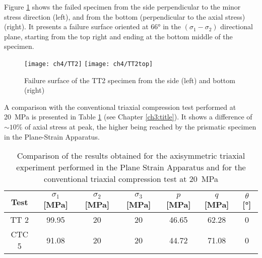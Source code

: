 Figure \ref{fig4:14} shows the failed specimen from the side perpendicular to the minor stress direction (left), and from the bottom (perpendicular to the axial stress)(right). It presents a failure surface oriented at \ang{66} in the $(\sigma_1-\sigma_{2})$ directional plane, starting from the top right and ending at the bottom middle of the specimen. 


\begin{figure}[!]
    \centering
    \texttt{[image: ch4/TT2]}
    \texttt{[image: ch4/TT2top]}
    \captionsetup{justification=centering}
    \caption{Failure surface of the TT2 specimen from the side (left) and bottom (right)}
    \label{fig4:14}
\end{figure} 





A comparison with the conventional triaxial compression test performed at \SI{20}{MPa} is presented in Table \ref{tb4:TT2_CTC5} (see Chapter \ref{ch3:title}). It shows a difference of $\sim 10\%$ of axial stress at peak, the higher being reached by the prismatic specimen in the Plane-Strain Apparatus.

\begin{table}
    \centering
    \captionsetup{justification=centering}
    \caption{Comparison of the results obtained for the axisymmetric triaxial experiment performed in the Plane Strain Apparatus and for the conventional triaxial compression test at \SI{20}{MPa}}
    \begin{tabular}{ccccccc}
        \hline
        Test & $\sigma_1$ [\si{MPa}] & $\sigma_2$ [\si{MPa}] & $\sigma_3$ [\si{MPa}] & $p$ [\si{MPa}] & $q$ [\si{MPa}] & $\theta$ [\si{\degree}] \\
        \hline
        \hline
        TT 2 & 99.95 & 20 & 20 & 46.65 & 62.28 & 0\\
        CTC 5 & 91.08 & 20 & 20 & 44.72 & 71.08 & 0 \\
        \hline
    \end{tabular}
    \label{tb4:TT2_CTC5}
\end{table}

